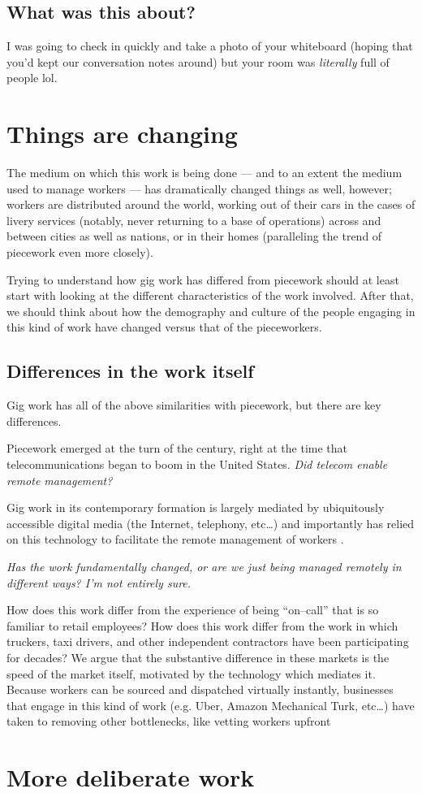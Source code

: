 \documentclass{sigchi}
\begin{document}
\subsection{What was this about?}
I was going to check in quickly and take a photo of your whiteboard
(hoping that you'd kept our conversation notes around)
but your room was \textit{literally} full of people lol.


\section{Things are changing}
The medium on which this work is being done
--- and to an extent the medium used to manage workers ---
has dramatically changed things as well, however;
workers are distributed around the world,
working out of their cars in the cases of livery services
(notably, never returning to a base of operations)
across and between cities as well as nations,
or in their homes
(paralleling the trend of piecework even more closely).

Trying to understand how gig work has differed from piecework should at least
start with looking at the different characteristics of the work involved.
After that, we should think about how
the demography and culture of the people engaging in this kind of work
have changed versus that of the pieceworkers.

\subsection{Differences in the work itself}
Gig work has all of the above similarities with piecework,
but there are key differences.

Piecework emerged at the turn of the  century,
right at the time that telecommunications began to boom in the United States. %
\textit{Did telecom enable remote management?}

Gig work in its contemporary formation is largely mediated by
ubiquitously accessible digital media
(the Internet, telephony, etc\dots)
and importantly has relied on this technology to facilitate the remote management of workers
\cite{uberAlgorithm}.

\textit{Has the work fundamentally changed,
or are we just being managed remotely in different ways?
I'm not entirely sure.}

How does this work differ from the experience of being ``on--call'' that is so familiar to retail employees?
How does this work differ from the work in which truckers, taxi drivers, and other
independent contractors have been participating for decades?
We argue that the substantive difference in these markets is the speed of the market itself,
motivated by the technology which mediates it.
Because workers can be sourced and dispatched virtually instantly,
businesses that engage in this kind of work
(e.g. Uber, Amazon Mechanical Turk, etc\dots)
have taken to removing other bottlenecks,
like vetting workers upfront


\section{More deliberate work}


\printbibliography
\end{document}

